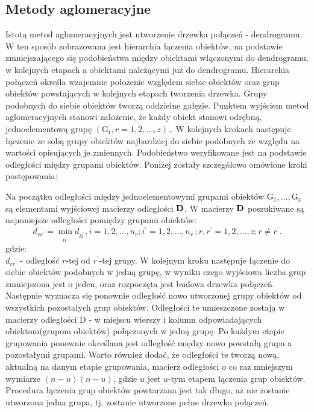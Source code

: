 \documentclass[12pt,a4paper]{report}
\begin{document}
\subsection{Metody aglomeracyjne}
\noindent
Istotą metod aglomeracyjnych jest utworzenie drzewka połączeń - dendrogramu. W ten sposób zobrazowana jest hierarchia łączenia obiektów, na podstawie zmniejszającego się podobieństwa między obiektami włączonymi do dendrogramu, w kolejnych etapach a obiektami należącymi już do dendrogramu. Hierarchia połączeń określa wzajemnie położenie względem siebie obiektów oraz grup obiektów powstających w kolejnych etapach tworzenia drzewka. Grupy podobnych do siebie obiektów tworzą oddzielne gałęzie.  
Punktem wyjściem metod aglomeracyjnych stanowi założenie, że każdy obiekt stanowi odrębną, jednoelementową grupę $(\mathrm{G_{r}}, r=1,2,...,z).$. W kolejnych krokach następuje łączenie ze sobą grupy obiektów najbardziej do siebie podobnych ze względu na wartości opisujących je zmiennych. Podobieństwo weryfikowane jest na podstawie odległości między grupami obiektów. Poniżej zostały szczegółowo omówione kroki postępowania:

Na początku odległości między jednoelementowymi grupami obiektów $\mathrm{G_{1}},...,\mathrm{G_{z}}$ są elementami wyjściowej macierzy odległości $\bold{D}$. W macierzy $\bold{D}$ poszukiwane są najmniejsze odległości pomiędzy grupami obiektów:
\begin{equation}
d_{rr^{'}}= \min\limits_{ii^{'}} {d_{ii^{'}}}, i=1,2,...,n_{r}; i^{'}=1,2,...,n_{r^{'}}; r,r^{'}=1,2,...,z; r\neq r^{'}.
\end{equation}
gdzie:\\
$d_{rr^{'}}$ - odległość $r$-tej od $r^{'}$-tej grupy.
W kolejnym kroku następuje łączenie do siebie obiektów podobnych w jedną grupę, w wyniku czego wyjściowa liczba grup zmniejszona jest o jeden, oraz rozpoczęta jest budowa drzewka połączeń. Następnie wyznacza się ponownie odległość nowo utworzonej grupy obiektów od wszystkich pozostałych grup obiektów. Odległości te umieszczone zostają w macierzy odległości $\mathrm{D}$ - w miejscu wierszy i kolumn odpowiadających obiektom(grupom obiektów) połączonych w jedną grupę. Po każdym etapie grupowania ponownie określana jest odległość między nowo powstałą grupa a pozostałymi grupami. Warto również dodać, że odległości te tworzą nową, aktualną na danym etapie grupowania, macierz odległości o co raz mniejszym wymiarze $(n-u)(n-u)$, gdzie $u$ jest $u$-tym etapem łączenia grup obiektów.  Procedura łączenia grup obiektów powtarzana jest tak długo, aż nie zostanie utworzona jedna grupa, tj. zostanie utworzone pełne drzewko połączeń. 
\end{document}

